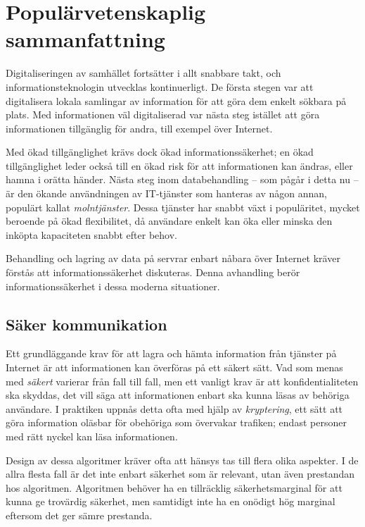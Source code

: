 

\chapter*{Populärvetenskaplig sammanfattning}

Digitaliseringen av samhället fortsätter i allt snabbare takt, och informationsteknologin utvecklas kontinuerligt.
De första stegen var att digitalisera lokala samlingar av information för att göra dem enkelt sökbara på plats.
Med informationen väl digitaliserad var nästa steg istället att göra informationen tillgänglig för andra, till exempel över Internet.

Med ökad tillgänglighet krävs dock ökad informationssäkerhet; en ökad tillgänglighet leder också till en ökad risk för att informationen kan ändras, eller hamna i orätta händer.
Nästa steg inom databehandling -- som pågår i detta nu -- är den ökande användningen av IT-tjänster som hanteras av någon annan, populärt kallat \emph{molntjänster}.
Dessa tjänster har snabbt växt i populäritet, mycket beroende på ökad flexibilitet, då användare enkelt kan öka eller minska den inköpta kapaciteten snabbt efter behov.

Behandling och lagring av data på servrar enbart nåbara över Internet kräver förstås att informationssäkerhet diskuteras.
Denna avhandling berör informationssäkerhet i dessa moderna situationer.

\section*{Säker kommunikation}

Ett grundläggande krav för att lagra och hämta information från tjänster på Internet är att informationen kan överföras på ett säkert sätt.
Vad som menas med \emph{säkert} varierar från fall till fall, men ett vanligt krav är att konfidentialiteten ska skyddas, det vill säga att informationen enbart ska kunna läsas av behöriga användare.
I praktiken uppnås detta ofta med hjälp av \emph{kryptering}, ett sätt att göra information oläsbar för obehöriga som övervakar trafiken; endast personer med rätt nyckel kan läsa informationen.

Design av dessa algoritmer kräver ofta att hänsys tas till flera olika aspekter.
I de allra flesta fall är det inte enbart säkerhet som är relevant, utan även prestandan hos algoritmen.
Algoritmen behöver ha en tillräcklig säkerhetsmarginal för att kunna ge trovärdig säkerhet, men samtidigt inte ha en onödigt hög marginal eftersom det ger sämre prestanda.

